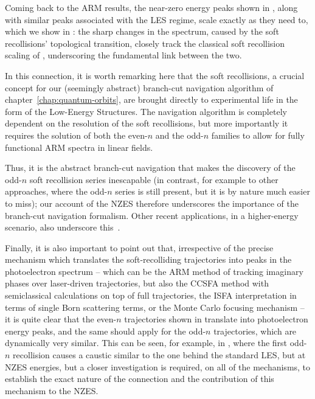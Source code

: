 Coming back to the ARM results, the near-zero energy peaks shown in , along with similar peaks associated with the LES regime, scale exactly as they need to, which we show in : the sharp changes in the spectrum, caused by the soft recollisions' topological transition, closely track the classical soft recollision scaling of , underscoring the fundamental link between the two.


In this connection, it is worth remarking here that the soft recollisions, a crucial concept for our (seemingly abstract) branch-cut navigation algorithm of chapter~\ref{chap:quantum-orbits}, are brought directly to experimental life in the form of the Low-Energy Structures. The navigation algorithm is completely dependent on the resolution of the soft recollisions, but more importantly it requires the solution of both the even-$n$ and the odd-$n$ families to allow for fully functional ARM spectra in linear fields. 

Thus, it is the abstract branch-cut navigation that makes the discovery of the odd-$n$ soft recollision series inescapable (in contrast, for example to other approaches, where the odd-$n$ series is still present, but it is by nature much easier to miss); our account of the NZES therefore underscores the importance of the branch-cut navigation formalism. Other recent applications, in a higher-energy scenario, also underscore this~\cite{keil_branch-cuts_2016}.



Finally, it is also important to point out that, irrespective of the precise mechanism which translates the soft-recolliding trajectories into peaks in the photoelectron spectrum -- which can be the ARM method of tracking imaginary phases over laser-driven trajectories, but also the CCSFA method with semiclassical calculations on top of full trajectories, the ISFA interpretation in terms of single Born scattering terms, or the Monte Carlo focusing mechanism -- it is quite clear that the even-$n$ trajectories shown in  translate into photoelectron energy peaks, and the same should apply for the odd-$n$ trajectories, which are dynamically very similar. This can be seen, for example, in , where the first odd-$n$ recollision causes a caustic similar to the one behind the standard LES, but at NZES energies, but a closer investigation is required, on all of the mechanisms, to establish the exact nature of the connection and the contribution of this mechanism to the NZES.














%
%
%
%
























